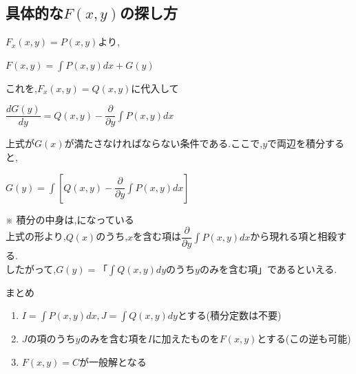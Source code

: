 \documentclass[a4paper]{jsarticle}
\begin{document}
\subsection{具体的な$F\left(x,y\right)$の探し方}
$F_x\left(x,y\right)=P\left(x,y\right)$より,
\begin{center}
    $F\left(x,y\right)=\displaystyle\int P\left(x,y\right)dx+G\left(y\right)$
\end{center}
これを,$F_x\left(x,y\right)=Q\left(x,y\right)$に代入して
\begin{center}
    $\displaystyle\dfrac{dG\left(y\right)}{dy}=Q\left(x,y\right)-\dfrac{\partial}{\partial y}\int P\left(x,y\right)dx$
\end{center}
上式が$G\left(x\right)$が満たさなければならない条件である.ここで,$y$で両辺を積分すると,
\begin{center}
    $\displaystyle G\left(y\right)=\int \left[Q\left(x,y\right)-\dfrac{\partial}{\partial y}\int P\left(x,y\right)dx\right]$
\end{center}
※ 積分の中身は,になっている\\
上式の形より,$Q\left(x\right)$のうち,$x$を含む項は$\dfrac{\partial}{\partial y}\int P\left(x,y\right)dx$から現れる項と相殺する.\\
したがって,$G\left(y\right)=$「$\int Q\left(x,y\right)dy$のうち$y$のみを含む項」であるといえる.
\begin{itembox}[l]{まとめ}
    \begin{enumerate}[(1)]
        \item $I=\int P\left(x,y\right)dx,J=\int Q\left(x,y\right)dy$とする(積分定数は不要)
        \item $J$の項のうち$y$のみを含む項を$I$に加えたものを$F\left(x,y\right)$とする(この逆も可能)
        \item $F\left(x,y\right)=C$が一般解となる
    \end{enumerate}
\end{itembox}
\end{document}
